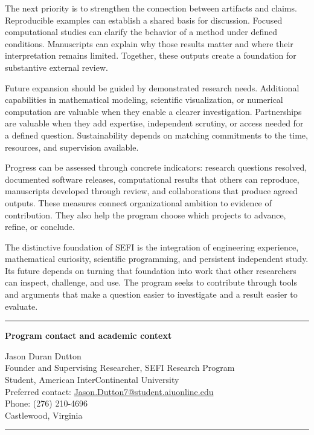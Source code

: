 \documentclass[10pt,letterpaper]{article}
\newcommand{\statement}[1]{\par\medskip\begingroup\color{Periwinkle}\hrule\smallskip\color{Ink}#1\par\smallskip\color{Periwinkle}\hrule\endgroup\medskip}
\begin{document}
The next priority is to strengthen the connection between artifacts and claims. Reproducible examples can establish a shared basis for discussion. Focused computational studies can clarify the behavior of a method under defined conditions. Manuscripts can explain why those results matter and where their interpretation remains limited. Together, these outputs create a foundation for substantive external review.

Future expansion should be guided by demonstrated research needs. Additional capabilities in mathematical modeling, scientific visualization, or numerical computation are valuable when they enable a clearer investigation. Partnerships are valuable when they add expertise, independent scrutiny, or access needed for a defined question. Sustainability depends on matching commitments to the time, resources, and supervision available.

Progress can be assessed through concrete indicators: research questions resolved, documented software releases, computational results that others can reproduce, manuscripts developed through review, and collaborations that produce agreed outputs. These measures connect organizational ambition to evidence of contribution. They also help the program choose which projects to advance, refine, or conclude.

The distinctive foundation of SEFI is the integration of engineering experience, mathematical curiosity, scientific programming, and persistent independent study. Its future depends on turning that foundation into work that other researchers can inspect, challenge, and use. The program seeks to contribute through tools and arguments that make a question easier to investigate and a result easier to evaluate.

\statement{\textbf{Program contact and academic context}\par Jason Duran Dutton\\Founder and Supervising Researcher, SEFI Research Program\\Student, American InterContinental University\\Preferred contact: \href{mailto:Jason.Dutton7@student.aiuonline.edu}{Jason.Dutton7@student.aiuonline.edu}\\Phone: (276) 210-4696\\Castlewood, Virginia}
\end{document}
